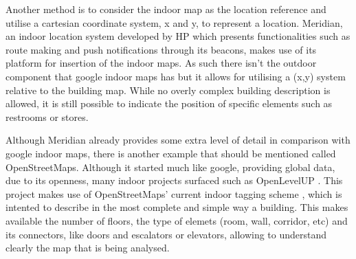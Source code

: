 Another method is to consider the indoor map as the location reference and utilise a cartesian coordinate system, x and y, to represent a location. Meridian, an indoor location system developed by HP \cite{meridian} which presents functionalities such as route making and push notifications through its beacons, makes use of its platform for insertion of the indoor maps. As such there isn't the outdoor component that google indoor maps has but it allows for utilising a (x,y) system relative to the building map. While no overly complex building description is allowed, it is still possible to indicate the position of specific elements such as restrooms or stores.

Although Meridian already provides some extra level of detail in comparison with google indoor maps, there is another example that should be mentioned called OpenStreetMaps. Although it started much like google, providing global data, due to its openness, many indoor projects surfaced such as OpenLevelUP \cite{openlevel}. This project makes use of OpenStreetMaps' current indoor tagging scheme \cite{opentagging}, which is intented to describe in the most complete and simple way a building. This makes available the number of floors, the type of elemets (room, wall, corridor, etc) and its connectors, like doors and escalators or elevators, allowing to understand clearly the map that is being analysed.
